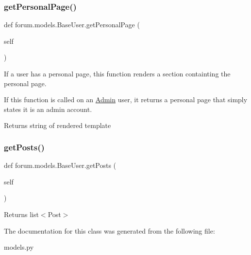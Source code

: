 \subsubsection{\texorpdfstring{get\+Personal\+Page()}{getPersonalPage()}}
{\footnotesize\ttfamily def forum.\+models.\+Base\+User.\+get\+Personal\+Page (\begin{DoxyParamCaption}\item[{}]{self }\end{DoxyParamCaption})}



If a user has a personal page, this function renders a section containting the personal page. 

If this function is called on an \mbox{\hyperlink{classforum_1_1models_1_1_admin}{Admin}} user, it returns a personal page that simply states it is an admin account.

\begin{DoxyReturn}{Returns}
string of rendered template 
\end{DoxyReturn}
\mbox{\label{classforum_1_1models_1_1_base_user_a1dbfb7a7c3370eb4fa6ff9b32cd8dc91}} 
\subsubsection{\texorpdfstring{get\+Posts()}{getPosts()}}
{\footnotesize\ttfamily def forum.\+models.\+Base\+User.\+get\+Posts (\begin{DoxyParamCaption}\item[{}]{self }\end{DoxyParamCaption})}

\begin{DoxyReturn}{Returns}
list$<$\+Post$>$ 
\end{DoxyReturn}


The documentation for this class was generated from the following file\+:\begin{DoxyCompactItemize}
\item 
models.\+py\end{DoxyCompactItemize}
